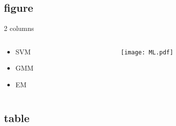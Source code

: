 \documentclass[UTF8, aspectratio=169 , 10pt，punct=kaiming]{beamer} %
\begin{document}
\subsection{figure}


\begin{frame}{ 2 columns }
  \begin{columns}
    \begin{column}{.15\textwidth}
      \begin{itemize}
        \item SVM
        \item GMM 
        \item EM
      \end{itemize}
    \end{column}
    \begin{column}{.8\textwidth}
      \begin{figure}[h]
        \centering
        \texttt{[image: ML.pdf]}
      \end{figure}
    \end{column}
  \end{columns}
\end{frame}



\subsection{table}
\end{document}
